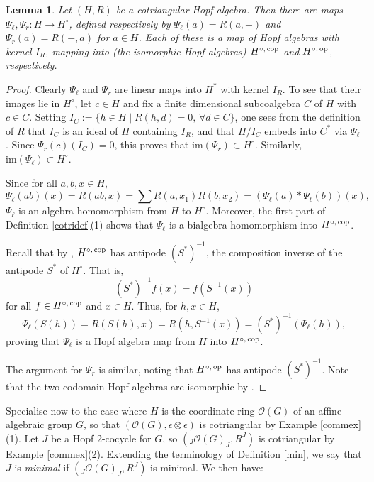 \documentclass{amsart}
\numberwithin{equation}{section}
\newtheorem{lemma}[theorem]{Lemma}
\theoremstyle{definition}
\begin{document}
\begin{lemma}\label{into1} 
Let $(H,R)$ be a cotriangular Hopf algebra. Then there are maps $\Psi_{\ell}, \Psi_r:H\to H^{\circ}$, defined respectively by $\Psi_{\ell}(a) = R(a, -)$ and $\Psi_r(a) = R(-,a)$ for $a \in H$. Each of these is a map of Hopf algebras with kernel $I_R$, mapping into (the isomorphic Hopf algebras) $H^{\circ, \, {\rm cop}}$ and  $H^{\circ,\, {\rm op}}$, respectively.
\end{lemma}

\begin{proof}
Clearly $\Psi_{\ell}$ and $\Psi_r$ are linear maps into $H^{\ast}$ with kernel $I_R$. To see that their images lie in $H^{\circ}$, let $c \in H$ and fix a finite dimensional subcoalgebra $C$ of $H$ with $c \in C$. Setting $I_C := \{h \in H\mid R(h,d) = 0,\, \forall d \in C\}$, one sees from the definition of $R$ that $I_C$ is an ideal of $H$ containing $I_R$, and that $H/I_C$ embeds into $C^{\ast}$ via $\Psi_{\ell}$. Since $\Psi_r (c)(I_C) = 0$, this proves that $\mathrm{im}(\Psi_{r}) \subset H^{\circ}$. Similarly, $\mathrm{im}(\Psi_{\ell}) \subset H^{\circ}$. 

Since for all $a,b,x \in H$,
$$ \Psi_{\ell}(ab)(x) = R(ab,x) = \sum R(a,x_1)R(b,x_2) = (\Psi_{\ell}(a)\ast\Psi_{\ell}(b))(x), $$
$\Psi_{\ell}$ is an algebra homomorphism from $H$ to $H^{\circ}$. Moreover, the first part of Definition \ref{cotridef}(1) shows that $\Psi_{\ell}$ is a bialgebra homomorphism into $H^{\circ, \, {\rm cop}}$. 

Recall that by \cite[Lemma 1.5.11]{M}, $H^{\circ, \, {\rm cop}}$ has antipode $(S^{\ast})^{-1}$, the composition inverse of the antipode $S^{\ast}$ of $H^{\circ}$. That is, 
$$(S^{\ast})^{-1}f(x)= f(S^{-1}(x)) $$
for all $f \in H^{\circ,\, {\rm cop}}$ and $x \in H$. Thus, for $h,x \in H$, 
$$ \Psi_{\ell}(S(h)) = R(S(h),x) = R(h, S^{-1}(x)) = (S^{\ast})^{-1}(\Psi_{\ell}(h)), $$
proving that $\Psi_{\ell}$ is a Hopf algebra map from $H$ into $H^{\circ, \, {\rm cop}}$.

The argument for $\Psi_r$ is similar, noting that $H^{\circ, \, {\rm op}}$ has antipode $(S^{\ast})^{-1}$. Note that the two codomain Hopf algebras are isomorphic by \cite[Corollary III.3.5]{K}.
\end{proof}

Specialise now to the case where $H$ is the coordinate ring $\mathcal{O}(G)$ of an affine algebraic group $G$, so that $(\mathcal{O}(G),\epsilon \otimes \epsilon)$ is cotriangular by Example \ref{commex}(1). Let $J$ be a Hopf $2$-cocycle for $G$, so $({}_J\mathcal{O}(G)_J,R^J)$ is cotriangular by Example \ref{commex}(2). Extending the terminology of Definition \ref{min}, we say that $J$ is \emph{minimal} if $({}_J\mathcal{O}(G)_J, R^J)$ is minimal. We then have:
\end{document}
